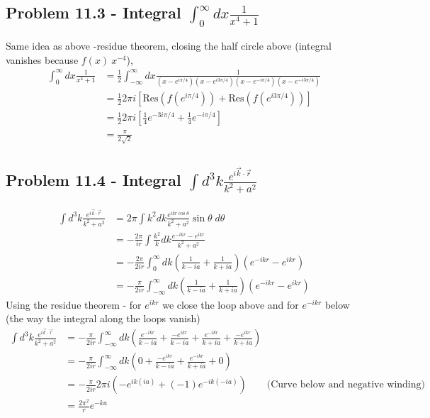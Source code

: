 \documentclass[10pt,a4paper]{book}
\theoremstyle{definition}
\begin{document}
\subsection{Problem 11.3 - Integral $\int_0^\infty dx \frac{1}{x^4+1}$}
Same idea as above -residue theorem, closing the half circle above (integral vanishes because $f(x)~x^{-4}$), 
\begin{align}
\int_0^\infty dx \frac{1}{x^4+1}
&=\frac{1}{2}\int_{-\infty}^\infty dx \frac{1}{(x-e^{i\pi/4})(x-e^{i3\pi/4})(x-e^{-i\pi/4})(x-e^{-i3\pi/4})}\\
&=\frac{1}{2}2\pi i\left[\text{Res}(f(e^{i\pi/4}))+\text{Res}(f(e^{i3\pi/4}))\right]\\
&=\frac{1}{2}2\pi i\left[\frac{1}{4}e^{-3i\pi/4}+\frac{1}{4}e^{-i\pi/4}\right]\\
&=\frac{\pi}{2\sqrt{2}}
\end{align}

\subsection{Problem 11.4 - Integral $\int d^3k \frac{e^{i\vec{k}\cdot\vec{r}}}{k^2+a^2}$}
\begin{align}
\int d^3k \frac{e^{i\vec{k}\cdot\vec{r}}}{k^2+a^2}
&=2\pi\int k^2dk \frac{e^{ikr\cos\theta}}{k^2+a^2}\sin\theta\;d\theta\\
&=-\frac{2\pi}{ir}\int \frac{k^2}{k}dk \frac{e^{-ikr}-e^{ikr}}{k^2+a^2}\\
&=-\frac{2\pi}{2ir}\int_0^\infty dk \left(\frac{1}{k-ia}+\frac{1}{k+ia}\right)\left(e^{-ikr}-e^{ikr}\right)\\
&=-\frac{\pi}{2ir}\int_{-\infty}^\infty dk \left(\frac{1}{k-ia}+\frac{1}{k+ia}\right)\left(e^{-ikr}-e^{ikr}\right)
\end{align}
Using the residue theorem - for $e^{ikr}$ we close the loop above and for $e^{-ikr}$ below (the way the integral along the loops vanish)
\begin{align}
\int d^3k \frac{e^{i\vec{k}\cdot\vec{r}}}{k^2+a^2}
&=-\frac{\pi}{2ir}\int_{-\infty}^\infty dk \left(\frac{e^{-ikr}}{k-ia}+\frac{-e^{ikr}}{k-ia}+\frac{e^{-ikr}}{k+ia}+\frac{-e^{ikr}}{k+ia}\right)\\
&=-\frac{\pi}{2ir}\int_{-\infty}^\infty dk \left(0+\frac{-e^{ikr}}{k-ia}+\frac{e^{-ikr}}{k+ia}+0\right)\\
&=-\frac{\pi}{2ir}2\pi i\left(-e^{ik(ia)}+(-1)e^{-ik(-ia)}\right)\qquad\text{(Curve below and negative winding)}\\
&=\frac{2\pi^2}{r}e^{-ka}
\end{align}
\end{document}
